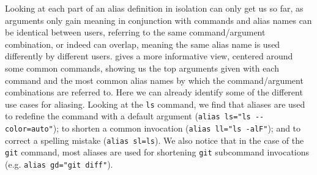 Looking at each part of an alias definition in isolation can only get us so far, as arguments only gain meaning in conjunction with commands and alias names can be identical between users, referring to the same command/argument combination, or indeed can overlap, meaning the same alias name is used differently by different users.
 gives a more informative view, centered around some common commands, showing us the top arguments given with each command and the most common alias names by which the command/argument combinations are referred to.
Here we can already identify some of the different use cases for aliasing.
Looking at the \texttt{ls} command, we find that aliases are used 
to redefine the command with a default argument (\verb|alias ls="ls --color=auto"|);
to shorten a common invocation (\verb|alias ll="ls -alF"|);
and to correct a spelling mistake (\verb|alias sl=ls|).
We also notice that in the case of the \texttt{git} command, most aliases are used for shortening \texttt{git} subcommand invocations (e.g. \verb|alias gd="git diff"|).

